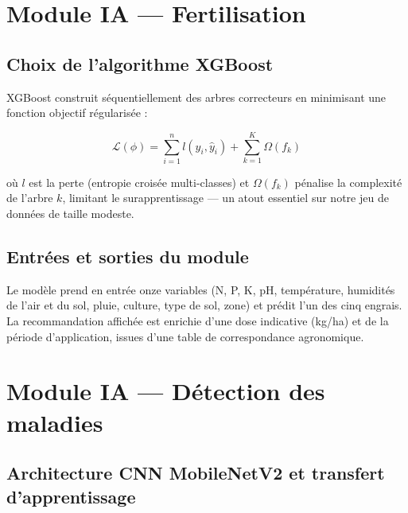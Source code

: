 \section{Module IA --- Fertilisation}
\label{sec:module_fertilisation}

\subsection{Choix de l'algorithme XGBoost}

XGBoost \cite{chen2016xgboost} construit séquentiellement des
arbres correcteurs en minimisant une fonction objectif
régularisée :

\begin{equation}
	\mathcal{L}(\phi) = \sum_{i=1}^{n} l\left(y_i, \hat{y}_i\right)
	+ \sum_{k=1}^{K} \Omega\left(f_k\right)
	\label{eq:xgb}
\end{equation}

où $l$ est la perte (entropie croisée multi-classes) et
$\Omega(f_k)$ pénalise la complexité de l'arbre $k$, limitant le
surapprentissage --- un atout essentiel sur notre jeu de données
de taille modeste.

\subsection{Entrées et sorties du module}

Le modèle prend en entrée onze variables (N, P, K, pH,
température, humidités de l'air et du sol, pluie, culture, type
de sol, zone) et prédit l'un des cinq engrais. La recommandation
affichée est enrichie d'une dose indicative (kg/ha) et de la
période d'application, issues d'une table de correspondance
agronomique.

\section{Module IA --- Détection des maladies}
\label{sec:module_maladies}

\subsection{Architecture CNN MobileNetV2 et transfert d'apprentissage}

